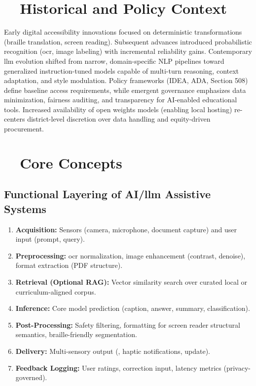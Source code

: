 \section{~~Historical and Policy Context}\label{ch9:sec:history-policy}
Early digital accessibility innovations focused on deterministic transformations (braille translation, screen reading). Subsequent  advances introduced probabilistic recognition (\gls{ocr}, image labeling) with incremental reliability gains.\supercite{IBMAIOCR, ABBYYAIOCR} Contemporary \gls{llm} evolution shifted from narrow, domain-specific NLP pipelines toward generalized instruction-tuned models capable of multi-turn reasoning, context adaptation, and style modulation. Policy frameworks (IDEA, ADA, Section 508) define baseline access requirements, while emergent governance emphasizes data minimization, fairness auditing, and transparency for AI-enabled educational tools.\supercite{AI_Ethics_Bias, DataPrivacyAI} Increased availability of open weights models (enabling local hosting) re-centers district-level discretion over data handling and equity-driven procurement.

\section{~~Core Concepts}\label{ch9:sec:core-concepts}

\subsection{Functional Layering of AI/\gls{llm} Assistive Systems}
\begin{enumerate}
	\item \textbf{Acquisition:} Sensors (camera, microphone, document capture) and user input (prompt, query).
	\item \textbf{Preprocessing:} \gls{ocr} normalization, image enhancement (contrast, denoise), format extraction (PDF structure).
	\item \textbf{Retrieval (Optional RAG):} Vector similarity search over curated local or curriculum-aligned corpus.
	\item \textbf{Inference:} Core model prediction (caption, answer, summary, classification).
	\item \textbf{Post-Processing:} Safety filtering, formatting for screen reader structural semantics, braille-friendly segmentation.
	\item \textbf{Delivery:} Multi-sensory output (, haptic notifications,  update).
	\item \textbf{Feedback Logging:} User ratings, correction input, latency metrics (privacy-governed).
\end{enumerate}

